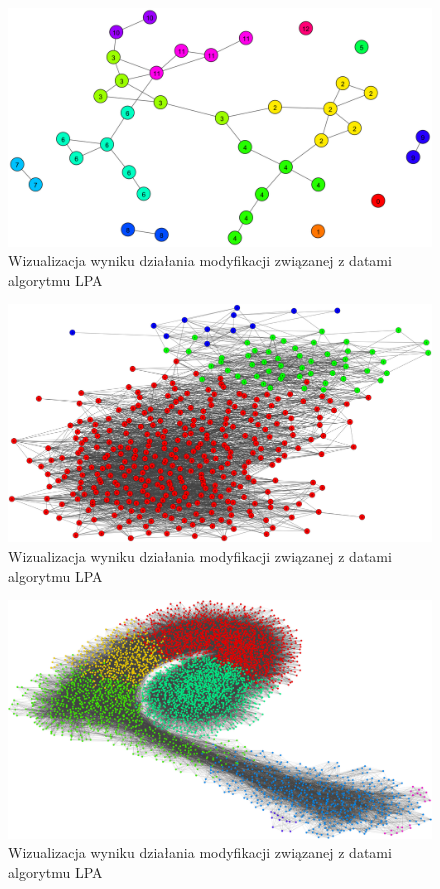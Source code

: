\documentclass{article}
\begin{document}
\begin{figure}[H]
\centering
\includegraphics[width=\textwidth]{images/ms-lpa-m1-0.png}
\caption{Wizualizacja wyniku działania modyfikacji związanej z datami algorytmu LPA} 
\end{figure}

\begin{figure}[H]
\centering
\includegraphics[width=\textwidth]{images/ms-lpa-m1-2.png}
\caption{Wizualizacja wyniku działania modyfikacji związanej z datami algorytmu LPA}
\end{figure}

\begin{figure}[H]
\centering
\includegraphics[width=\textwidth]{images/ms-m1-nba.png}
\caption{Wizualizacja wyniku działania modyfikacji związanej z datami algorytmu LPA}
\end{figure}
\end{document}
